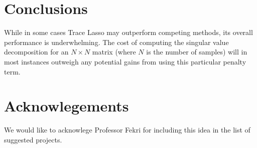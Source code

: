\documentclass[11pt]{article}
\begin{document}
\section{Conclusions}
While in some cases Trace Lasso may outperform competing methods, its overall performance is underwhelming. The cost of computing the singular value decomposition for an $N\times N$ matrix (where $N$ is the number of samples) will in most instances outweigh any potential gains from using this particular penalty term.
\section{Acknowlegements}
We would like to acknowlege Professor Fekri for including this idea in the list of suggested projects.

{}

\end{document}
